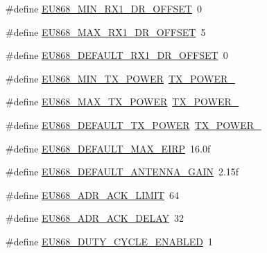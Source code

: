 \begin{DoxyCompactItemize}
\item 
\#define \mbox{\hyperlink{group___r_e_g_i_o_n_e_u868_gac803b58ed61f47042654f6e0331b26db}{E\+U868\+\_\+\+M\+I\+N\+\_\+\+R\+X1\+\_\+\+D\+R\+\_\+\+O\+F\+F\+S\+ET}}~0
\item 
\#define \mbox{\hyperlink{group___r_e_g_i_o_n_e_u868_ga90ce5649045707b0bbaaa0bbd039940b}{E\+U868\+\_\+\+M\+A\+X\+\_\+\+R\+X1\+\_\+\+D\+R\+\_\+\+O\+F\+F\+S\+ET}}~5
\item 
\#define \mbox{\hyperlink{group___r_e_g_i_o_n_e_u868_gab3c86769eb58a2529ede7cd544bffc58}{E\+U868\+\_\+\+D\+E\+F\+A\+U\+L\+T\+\_\+\+R\+X1\+\_\+\+D\+R\+\_\+\+O\+F\+F\+S\+ET}}~0
\item 
\#define \mbox{\hyperlink{group___r_e_g_i_o_n_e_u868_gab935a0225d447579203239740e33c72f}{E\+U868\+\_\+\+M\+I\+N\+\_\+\+T\+X\+\_\+\+P\+O\+W\+ER}}~\mbox{\hyperlink{group___r_e_g_i_o_n_ga3c7bd9a98f0c1e7e9aaa90857c4bd700}{T\+X\+\_\+\+P\+O\+W\+E\+R\+\_}}
\item 
\#define \mbox{\hyperlink{group___r_e_g_i_o_n_e_u868_ga39e338c7f8454f594302811f61d9560d}{E\+U868\+\_\+\+M\+A\+X\+\_\+\+T\+X\+\_\+\+P\+O\+W\+ER}}~\mbox{\hyperlink{group___r_e_g_i_o_n_gab33618449f2a573142c463ab071ef8ed}{T\+X\+\_\+\+P\+O\+W\+E\+R\+\_}}
\item 
\#define \mbox{\hyperlink{group___r_e_g_i_o_n_e_u868_ga2e0b523fc68d50dc0711a07d8926c8c6}{E\+U868\+\_\+\+D\+E\+F\+A\+U\+L\+T\+\_\+\+T\+X\+\_\+\+P\+O\+W\+ER}}~\mbox{\hyperlink{group___r_e_g_i_o_n_gab33618449f2a573142c463ab071ef8ed}{T\+X\+\_\+\+P\+O\+W\+E\+R\+\_}}
\item 
\#define \mbox{\hyperlink{group___r_e_g_i_o_n_e_u868_ga1637006dd28e0ae483e1260c2152ece2}{E\+U868\+\_\+\+D\+E\+F\+A\+U\+L\+T\+\_\+\+M\+A\+X\+\_\+\+E\+I\+RP}}~16.\+0f
\item 
\#define \mbox{\hyperlink{group___r_e_g_i_o_n_e_u868_ga943854d7099f892dd9dc86a6accbd813}{E\+U868\+\_\+\+D\+E\+F\+A\+U\+L\+T\+\_\+\+A\+N\+T\+E\+N\+N\+A\+\_\+\+G\+A\+IN}}~2.\+15f
\item 
\#define \mbox{\hyperlink{group___r_e_g_i_o_n_e_u868_ga67c54d4a8b30d30138dd013779f72cdf}{E\+U868\+\_\+\+A\+D\+R\+\_\+\+A\+C\+K\+\_\+\+L\+I\+M\+IT}}~64
\item 
\#define \mbox{\hyperlink{group___r_e_g_i_o_n_e_u868_ga13b5d7d3346971d4dda9919ed73b1394}{E\+U868\+\_\+\+A\+D\+R\+\_\+\+A\+C\+K\+\_\+\+D\+E\+L\+AY}}~32
\item 
\#define \mbox{\hyperlink{group___r_e_g_i_o_n_e_u868_gaa8c53df1d013b427281bafe2ed9cbcce}{E\+U868\+\_\+\+D\+U\+T\+Y\+\_\+\+C\+Y\+C\+L\+E\+\_\+\+E\+N\+A\+B\+L\+ED}}~1
\item 

\end{DoxyCompactItemize}
